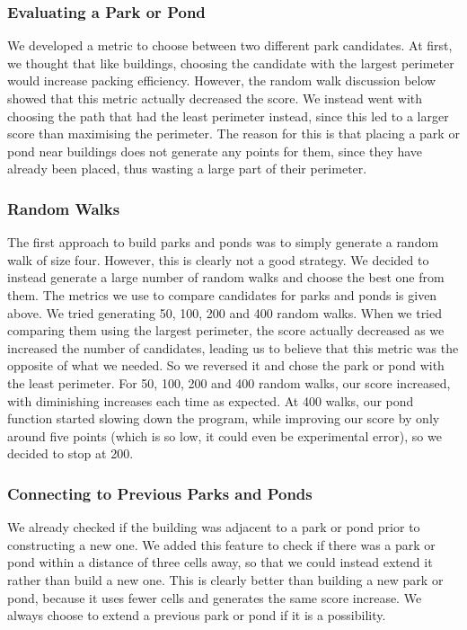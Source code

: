 \subsubsection{Evaluating a Park or Pond}
We developed a metric to choose between two different park candidates. At first, we thought that like buildings, choosing the candidate with the largest perimeter would increase packing efficiency. However, the random walk discussion below showed that this metric actually decreased the score. We instead went with choosing the path that had the least perimeter instead, since this led to a larger score than maximising the perimeter. The reason for this is that placing a park or pond near buildings does not generate any points for them, since they have already been placed, thus wasting a large part of their perimeter.

\subsubsection{Random Walks}
The first approach to build parks and ponds was to simply generate a random walk of size four. However, this is clearly not a good strategy. We decided to instead generate a large number of random walks and choose the best one from them. The metrics we use to compare candidates for parks and ponds is given above. We tried generating 50, 100, 200 and 400 random walks. When we tried comparing them using the largest perimeter, the score actually decreased as we increased the number of candidates, leading us to believe that this metric was the opposite of what we needed. So we reversed it and chose the park or pond with the least perimeter. For 50, 100, 200 and 400 random walks, our score increased, with diminishing increases each time as expected. At 400 walks, our pond function started slowing down the program, while improving our score by only around five points (which is so low, it could even be experimental error), so we decided to stop at 200. 

\subsubsection{Connecting to Previous Parks and Ponds}
We already checked if the building was adjacent to a park or pond prior to constructing a new one. We added this feature to check if there was a park or pond within a distance of three cells away, so that we could instead extend it rather than build a new one. This is clearly better than building a new park or pond, because it uses fewer cells and generates the same score increase. We always choose to extend a previous park or pond if it is a possibility.

